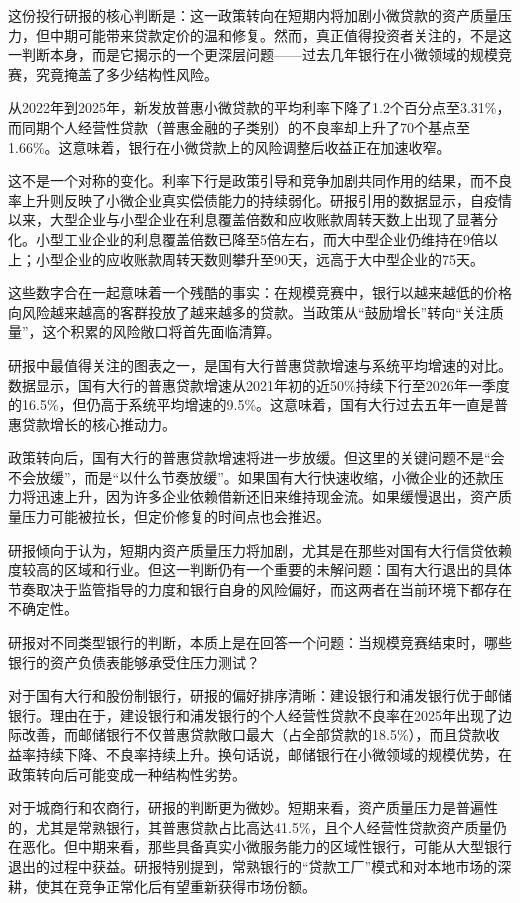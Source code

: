 \documentclass[11pt]{ctexart}
\begin{document}
这份投行研报的核心判断是：这一政策转向在短期内将加剧小微贷款的资产质量压力，但中期可能带来贷款定价的温和修复。然而，真正值得投资者关注的，不是这一判断本身，而是它揭示的一个更深层问题——过去几年银行在小微领域的规模竞赛，究竟掩盖了多少结构性风险。

从2022年到2025年，新发放普惠小微贷款的平均利率下降了1.2个百分点至3.31\%，而同期个人经营性贷款（普惠金融的子类别）的不良率却上升了70个基点至1.66\%。这意味着，银行在小微贷款上的风险调整后收益正在加速收窄。

这不是一个对称的变化。利率下行是政策引导和竞争加剧共同作用的结果，而不良率上升则反映了小微企业真实偿债能力的持续弱化。研报引用的数据显示，自疫情以来，大型企业与小型企业在利息覆盖倍数和应收账款周转天数上出现了显著分化。小型工业企业的利息覆盖倍数已降至5倍左右，而大中型企业仍维持在9倍以上；小型企业的应收账款周转天数则攀升至90天，远高于大中型企业的75天。

这些数字合在一起意味着一个残酷的事实：在规模竞赛中，银行以越来越低的价格向风险越来越高的客群投放了越来越多的贷款。当政策从“鼓励增长”转向“关注质量”，这个积累的风险敞口将首先面临清算。

研报中最值得关注的图表之一，是国有大行普惠贷款增速与系统平均增速的对比。数据显示，国有大行的普惠贷款增速从2021年初的近50\%持续下行至2026年一季度的16.5\%，但仍高于系统平均增速的9.5\%。这意味着，国有大行过去五年一直是普惠贷款增长的核心推动力。

政策转向后，国有大行的普惠贷款增速将进一步放缓。但这里的关键问题不是“会不会放缓”，而是“以什么节奏放缓”。如果国有大行快速收缩，小微企业的还款压力将迅速上升，因为许多企业依赖借新还旧来维持现金流。如果缓慢退出，资产质量压力可能被拉长，但定价修复的时间点也会推迟。

研报倾向于认为，短期内资产质量压力将加剧，尤其是在那些对国有大行信贷依赖度较高的区域和行业。但这一判断仍有一个重要的未解问题：国有大行退出的具体节奏取决于监管指导的力度和银行自身的风险偏好，而这两者在当前环境下都存在不确定性。

研报对不同类型银行的判断，本质上是在回答一个问题：当规模竞赛结束时，哪些银行的资产负债表能够承受住压力测试？

对于国有大行和股份制银行，研报的偏好排序清晰：建设银行和浦发银行优于邮储银行。理由在于，建设银行和浦发银行的个人经营性贷款不良率在2025年出现了边际改善，而邮储银行不仅普惠贷款敞口最大（占全部贷款的18.5\%），而且贷款收益率持续下降、不良率持续上升。换句话说，邮储银行在小微领域的规模优势，在政策转向后可能变成一种结构性劣势。

对于城商行和农商行，研报的判断更为微妙。短期来看，资产质量压力是普遍性的，尤其是常熟银行，其普惠贷款占比高达41.5\%，且个人经营性贷款资产质量仍在恶化。但中期来看，那些具备真实小微服务能力的区域性银行，可能从大型银行退出的过程中获益。研报特别提到，常熟银行的“贷款工厂”模式和对本地市场的深耕，使其在竞争正常化后有望重新获得市场份额。
\end{document}
